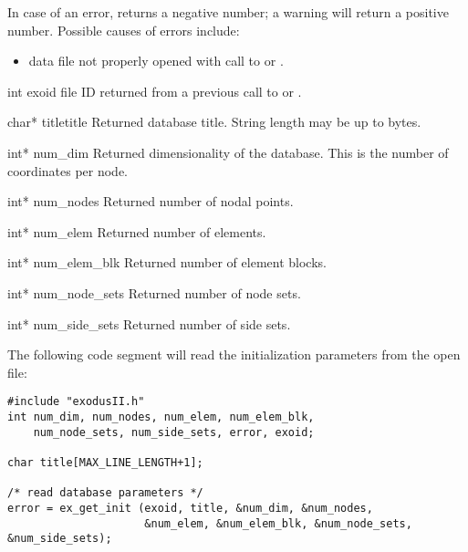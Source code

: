 In case of an error,  returns a negative number;
a warning will return a positive number. Possible causes of errors
include:

\begin{itemize}
 \item data file not properly opened with call to  
or .
\end{itemize}


\begin{parameters}
\item[{int exoid \R{}}]
\exo{} file ID returned from a previous call to  
or .

\item[{char* titletitle \W{}}]
Returned database title. String length may be up to
 bytes.

\item[{int* num_dim \W{}}]
Returned dimensionality of the database. This is the number of
coordinates per node.

\item[{int* num_nodes \W{}}]
Returned number of nodal points.

\item[{int* num_elem \W{}}]
Returned number of elements.

\item[{int* num_elem_blk \W{}}]
Returned number of element blocks.

\item[{int* num_node_sets \W{}}]
Returned number of node sets.

\item[{int* num_side_sets \W{}}]
Returned number of side sets.
\end{parameters}

The following code segment will read the initialization parameters
from the open \exo{} file:

\begin{lstlisting}
#include "exodusII.h"
int num_dim, num_nodes, num_elem, num_elem_blk,
    num_node_sets, num_side_sets, error, exoid;

char title[MAX_LINE_LENGTH+1];

/* read database parameters */
error = ex_get_init (exoid, title, &num_dim, &num_nodes, 
                     &num_elem, &num_elem_blk, &num_node_sets, &num_side_sets);
\end{lstlisting}


